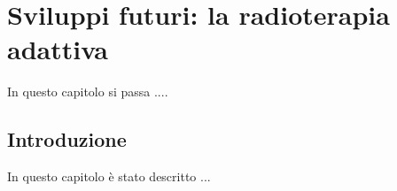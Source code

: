 \chapter{Sviluppi futuri: la radioterapia adattiva}
\minitoc
\textsf{In questo capitolo si passa ....}



\section{Introduzione}
In questo capitolo è stato descritto ...












